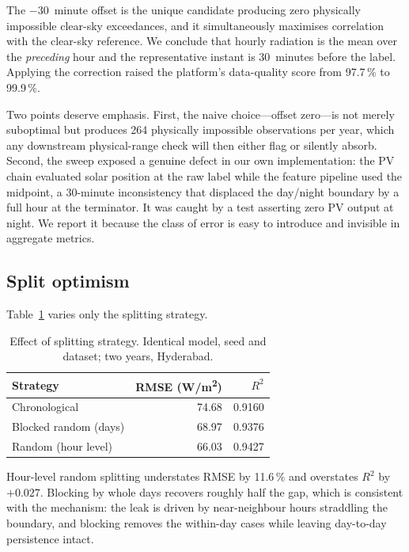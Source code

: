 \documentclass[conference]{IEEEtran}
\begin{document}
The $-30$~minute offset is the unique candidate producing zero
physically impossible clear-sky exceedances, and it simultaneously
maximises correlation with the clear-sky reference. We conclude that
hourly radiation is the mean over the \emph{preceding} hour and the
representative instant is 30~minutes before the label. Applying the
correction raised the platform's data-quality score from 97.7\,\% to
99.9\,\%.

Two points deserve emphasis. First, the naive choice---offset
zero---is not merely suboptimal but produces 264 physically impossible
observations per year, which any downstream physical-range check will
then either flag or silently absorb. Second, the sweep exposed a
genuine defect in our own implementation: the PV chain evaluated solar
position at the raw label while the feature pipeline used the
midpoint, a 30-minute inconsistency that displaced the day/night
boundary by a full hour at the terminator. It was caught by a test
asserting zero PV output at night. We report it because the class of
error is easy to introduce and invisible in aggregate metrics.

\subsection{Split optimism}
\label{sec:f2}

Table~\ref{tab:f2} varies only the splitting strategy.

\begin{table}[!t]
\caption{Effect of splitting strategy. Identical model, seed and
dataset; two years, Hyderabad.}
\label{tab:f2}
\centering
\begin{tabular}{lrr}
\toprule
Strategy & RMSE (W/m\textsuperscript{2}) & $R^{2}$ \\
\midrule
Chronological          & 74.68 & 0.9160 \\
Blocked random (days)  & 68.97 & 0.9376 \\
Random (hour level)    & 66.03 & 0.9427 \\
\bottomrule
\end{tabular}
\end{table}

Hour-level random splitting understates RMSE by 11.6\,\% and overstates
$R^{2}$ by $+0.027$. Blocking by whole days recovers roughly half the
gap, which is consistent with the mechanism: the leak is driven by
near-neighbour hours straddling the boundary, and blocking removes the
within-day cases while leaving day-to-day persistence intact.
\end{document}
